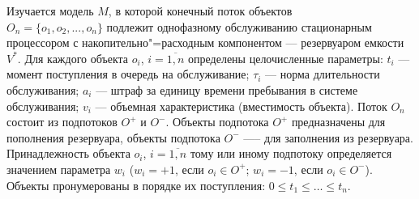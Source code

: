 \begin{ptkarticle}



Изучается модель $M$, в которой конечный поток объектов\\$O_n=\{o_1, o_2, ..., o_n\}$
подлежит однофазному обслуживанию стационарным процессором с накопительно"=расходным компонентом --- резервуаром емкости $V^*$. Для каждого объекта $o_i$, $i=\overline{1,n}$ определены целочисленные параметры: $t_i$ — момент поступления в очередь на обслуживание; $\tau_i$ — норма длительности обслуживания; $a_i$ — штраф за единицу времени пребывания в системе обслуживания; $v_i$ — объемная характеристика (вместимость объекта). Поток $O_n$ состоит из подпотоков $O^+$ и $O^-$. Объекты подпотока $O^+$ предназначены для пополнения резервуара, объекты подпотока $O^-$ —-- для заполнения из резервуара. Принадлежность объекта $o_i$, $i=\overline{1,n}$ тому или иному подпотоку определяется значением параметра $w_i$ ($w_i=+1$, если $o_i\in{O^+}$; $w_i=-1$, если $o_i\in{O^-}$). Объекты пронумерованы в порядке их поступления: $0\leq{t_1}\leq{…}\leq{t_n}$.


\end{ptkarticle}
